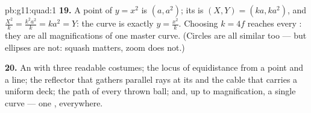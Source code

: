 \begin{solution}{pb:g11:quad:1}
\textbf{19.} A point of $y = x^2$ is $(a, a^2)$; its  is
$(X, Y) = (ka, ka^2)$, and $\frac{X^2}{k} = \frac{k^2a^2}{k} =
ka^2 = Y$: the  curve is exactly $y = \frac{x^2}{k}$.
Choosing $k = 4f$ reaches every : they are all
magnifications of one master curve. (Circles are all similar
too --- but ellipses are not: squash matters, zoom does not.)

\textbf{20.} An  with three readable costumes; the
locus of equidistance from a point and a line; the reflector
that gathers parallel rays at its  and the cable that
carries a uniform deck; the path of every thrown ball; and,
up to magnification, a single curve --- one ,
everywhere.
\end{solution}
